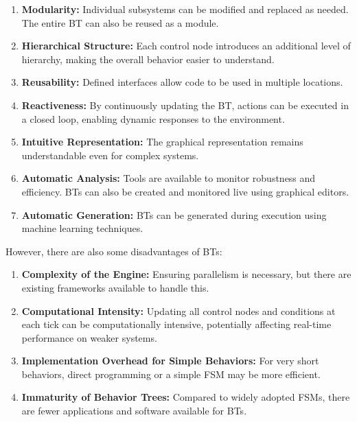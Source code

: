 \begin{enumerate}
  \item \textbf{Modularity:} Individual subsystems can be modified and replaced as needed. The entire BT can also be reused as a module.
  \item \textbf{Hierarchical Structure:} Each control node introduces an additional level of hierarchy, making the overall behavior easier to understand.
  \item \textbf{Reusability:} Defined interfaces allow code to be used in multiple locations.
  \item \textbf{Reactiveness:} By continuously updating the BT, actions can be executed in a closed loop, enabling dynamic responses to the environment.
  \item \textbf{Intuitive Representation:} The graphical representation remains understandable even for complex systems.
  \item \textbf{Automatic Analysis:} Tools are available to monitor robustness and efficiency. BTs can also be created and monitored live using graphical editors.
  \item \textbf{Automatic Generation:} BTs can be generated during execution using machine learning techniques.
\end{enumerate}

However, there are also some disadvantages of BTs:

\begin{enumerate}
  \item \textbf{Complexity of the Engine:} Ensuring parallelism is necessary, but there are existing frameworks available to handle this.
  \item \textbf{Computational Intensity:} Updating all control nodes and conditions at each tick can be computationally intensive, potentially affecting real-time performance on weaker systems.
  \item \textbf{Implementation Overhead for Simple Behaviors:} For very short behaviors, direct programming or a simple FSM may be more efficient.
  \item \textbf{Immaturity of Behavior Trees:} Compared to widely adopted FSMs, there are fewer applications and software available for BTs.
\end{enumerate}

